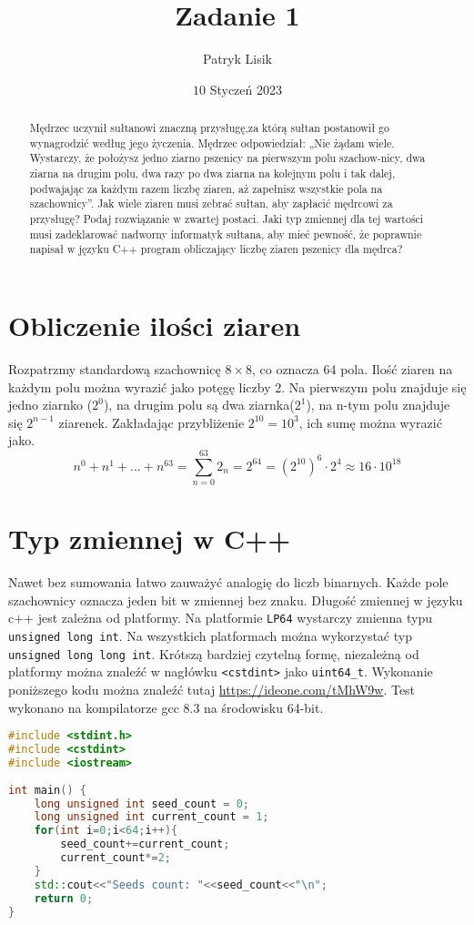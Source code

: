 \documentclass[12pt]{article}
\title{Zadanie 1}
\author{Patryk Lisik}
\date{\(10\) Styczeń  2023}
\def\code#1{\texttt{#1}}
\begin{document}
\markboth{\theauthor}{\thetitle}

\maketitle


\begin{abstract}
Mędrzec uczynił sułtanowi znaczną przysługę,za którą sułtan postanowił go wynagrodzić według jego życzenia. Mędrzec odpowiedział: „Nie żądam wiele. Wystarczy, że położysz jedno ziarno pszenicy na pierwszym polu szachow-nicy, dwa ziarna na drugim polu, dwa razy po dwa ziarna na kolejnym polu i tak dalej, podwajając za każdym razem liczbę ziaren, aż zapełnisz wszystkie pola na szachownicy”. 
Jak wiele ziaren musi zebrać sułtan, aby zapłacić mędrcowi za przysługę?  Podaj rozwiązanie w zwartej postaci.
Jaki typ zmiennej dla tej wartości musi zadeklarować nadworny informatyk sułtana, aby mieć pewność, że poprawnie napisał w języku C++ program obliczający liczbę ziaren pszenicy dla mędrca?
\end{abstract}


\section{Obliczenie ilości ziaren}
Rozpatrzmy standardową szachownicę $8\times8$, co oznacza 64 pola. 
Ilość ziaren na każdym polu można wyrazić jako potęgę liczby 2. 
Na pierwszym polu znajduje się jedno ziarnko ($2^0$), na drugim polu są dwa ziarnka($2^1$), na n-tym polu znajduje się $2^{n-1}$ ziarenek.
Zakładając przybliżenie $2^{10}=10^3$, ich sumę można wyrazić jako. 
$$
n^0+n^1+\dots+n^{63}=\sum^{63}_{n=0} 2_n = 2^{64} = \left(2^{10}\right)^6 \cdot 2^4 \approx 16 \cdot 10^{18}
$$
\section{Typ zmiennej w C++}
Nawet bez sumowania łatwo zauważyć analogię do liczb binarnych. 
Każde pole szachownicy oznacza jeden bit w zmiennej bez znaku. 
Długość zmiennej w języku c++ jest zależna od platformy. 
Na platformie \code{LP64} wystarczy zmienna typu \code{unsigned long int}. 
Na wszystkich platformach można wykorzystać typ \code{unsigned long long int}.
Krótszą bardziej czytelną formę, niezależną od platformy można znaleźć w nagłówku \code{<cstdint>} jako \code{uint64\_t}.
Wykonanie poniższego kodu można znaleźć tutaj \url{https://ideone.com/tMhW9w}.
Test wykonano na kompilatorze gcc 8.3 na środowisku 64-bit. 

\begin{lstlisting}[language=C++ ,caption= Kod obliczający ilość ziarenek.]
#include <stdint.h>
#include <cstdint>
#include <iostream>
 
int main() {
	long unsigned int seed_count = 0;
	long unsigned int current_count = 1;
	for(int i=0;i<64;i++){
		seed_count+=current_count;
		current_count*=2;
	}
	std::cout<<"Seeds count: "<<seed_count<<"\n";
	return 0;
}

\end{lstlisting}
\end{document}
